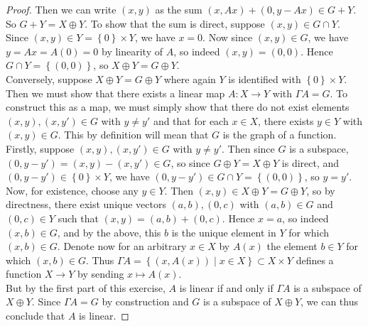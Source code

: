 \documentclass[reqno]{amsart}
\theoremstyle{definition}
\theoremstyle{remark}
\begin{document}
\begin{proof}
    Then we can write $(x,y)$ as the sum
    $\left( x, Ax \right) + \left( 0, y-Ax \right) 
    \in G + Y$. So $G + Y = X \oplus Y$. To show that
    the sum is direct, suppose
    $\left( x,y \right) \in G \cap Y$.
    Since  $\left( x,y \right) \in Y = \left\{ 0 \right\} \times Y$,
    we have $x = 0$. Now since
    $\left( x,y \right) \in G$, we have
    $y = Ax = A(0) = 0$ by linearity of $A$, so
    indeed $\left( x,y \right) = (0,0)$. Hence
    $G \cap Y = \left\{ (0,0) \right\} $, so
    $X \oplus Y = G \oplus Y$.\\
    \linebreak
    Conversely, suppose $X \oplus Y = G \oplus Y$ where
    again $Y$ is identified with $\left\{ 0 \right\} \times Y$.
    Then we must show that
    there exists a linear map $A \colon X \to Y$ with
    $\Gamma A = G$. To construct this as a map, we must
    simply show that there do not exist elements
    $\left( x,y \right) , \left( x,y' \right) \in G$ with
    $y\neq y'$ and that for each $x \in X$, there
    exists $y \in Y$ with $\left( x,y \right) \in G$. This
    by definition will mean that $G$ is the
    graph of a function.\\
    Firstly, suppose
    $ \left( x,y \right) , \left( x,y' \right) \in G$ with
    $y \neq y'$. Then since $G$ is a subspace,
    $\left( 0, y-y' \right) 
    = \left( x,y \right) - (x,y') \in G$, so
    since $G \oplus Y = X \oplus Y$ is direct, and
    $\left( 0, y-y' \right) \in \left\{ 0 \right\} \times Y$, we
    have $\left( 0, y-y' \right) \in G \cap Y
    = \left\{ (0,0) \right\} $, so
    $y = y'$.\\
    Now, for existence, choose any
    $y \in Y$. Then
    $(x,y) \in X \oplus Y = G \oplus Y$, so
    by directness, there exist unique vectors
    $\left( a,b \right) , (0,c)$ with
    $(a,b) \in G$ and $(0,c) \in Y$ such that
    $(x,y) = (a,b) + (0,c)$. Hence
    $x = a$, so indeed
    $(x,b) \in G$, and by the above, this $b$ is the
    unique element in $Y$ for which
    $(x,b) \in G$. Denote now for an arbitrary $x \in X$ 
    by $A(x)$ the element $b \in Y$ for which
    $(x,b) \in G$. Thus
    $\Gamma A
    = \left\{ \left( x, A(x) \right)  \mid 
    x \in X\right\} \subset X \times Y$ defines a function $X \to Y$ 
    by sending $x \mapsto A(x)$.\\
    \linebreak
    But by the first part of this exercise,
    $A$ is linear if and only if $\Gamma A$ is a
    subspace of $X \oplus Y$. Since
    $\Gamma A = G$ by construction and
    $G$ is a subspace of $X \oplus Y$, we can thus conclude that
    $A$ is linear.
\end{proof}
\end{document}
